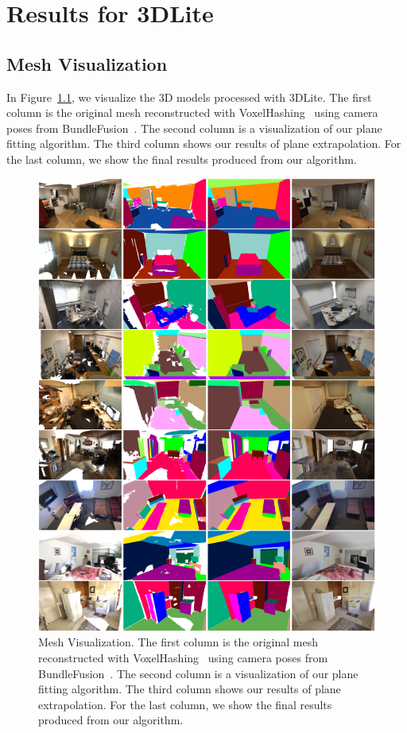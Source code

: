 \appendix
\chapter{Results for 3DLite}
\section{Mesh Visualization}
In Figure~\ref{fig:vis}, we visualize the 3D models processed with 3DLite. 
The first column is the original mesh reconstructed with VoxelHashing~\cite{niessner2013real} using camera poses from BundleFusion~\cite{dai2016bundlefusion}. 
The second column is a visualization of our plane fitting algorithm. 
The third column shows our results of plane extrapolation. 
For the last column, we show the final results produced from our algorithm.
\begin{figure}
    \centering
    \includegraphics[width=0.9\linewidth]{3dlite/fig22.png}
    \caption{Mesh Visualization.  The first column is the original mesh reconstructed with VoxelHashing~\cite{niessner2013real} using camera poses from BundleFusion~\cite{dai2016bundlefusion}. The second column is a visualization of our plane fitting algorithm. The third column shows our results of plane extrapolation. For the last column, we show the final results produced from our algorithm.}
    \label{fig:vis}
\end{figure}

